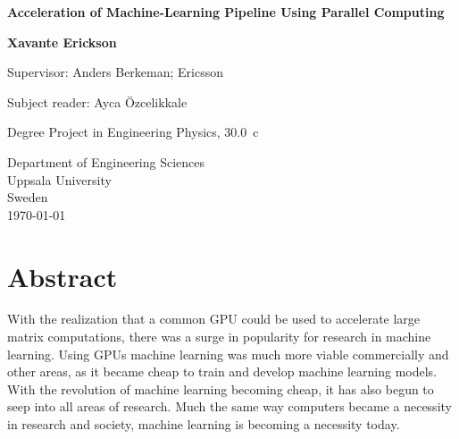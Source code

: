 \documentclass[12pt, a4paper]{article}
\title{}
\author{Lowe Erickson }
\date{May 2018}
\begin{document}
\begin{titlepage}
   \begin{center}
        \vspace*{1cm}
        \Huge
        \textbf{Acceleration of
        Machine-Learning Pipeline Using Parallel Computing}
 
        \LARGE
        \vspace{1cm}
       
        \textbf{Xavante Erickson}
 
        \vfill
        
        Supervisor: Anders Berkeman; Ericsson

        \vspace{0.5cm}
        
        Subject reader: Ayca Özcelikkale
        
        \vspace{0.5cm}

        Degree Project in Engineering Physics, \SI{30.0}{c}
 
        \vspace{0.8cm}
 
 
        Department of Engineering Sciences\\
        \vspace{0.2cm}
        Uppsala University\\
        \vspace{0.2cm}
        Sweden\\
        \vspace{0.2cm}
        \today
   \end{center}
\end{titlepage}



\section*{Abstract}
With the realization that a common GPU could be used to accelerate large matrix computations, there was a surge in popularity for research in machine learning.
Using GPUs machine learning was much more viable commercially and other areas, as it became cheap to train and develop machine learning models.
With the revolution of machine learning becoming cheap, it has also begun to seep into all areas of research. 
Much the same way computers became a necessity in research and society, machine learning is becoming a necessity today.
\end{document}
